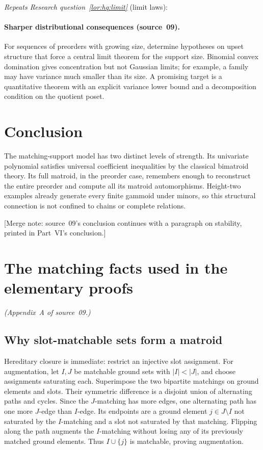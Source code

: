 \documentclass[11pt]{article}
\numberwithin{equation}{section}
\theoremstyle{definition}
\begin{document}
\noindent\emph{Repeats Research question~\ref{lor:hq:limit}} (limit laws):
\paragraph{Sharper distributional consequences (source~09).}
For sequences of preorders with growing size, determine hypotheses on
upset structure that force a central limit theorem for the support size.
Binomial convex domination gives concentration but not Gaussian limits;
for example, a family may have variance much smaller than its size.
A promising target is a quantitative theorem with an explicit variance
lower bound and a decomposition condition on the quotient poset.


\section{Conclusion}
\label{mat:sec:conclusion}
The matching-support model has two distinct levels of strength. Its
univariate polynomial satisfies universal coefficient inequalities by the
classical bimatroid theory. Its full matroid, in the preorder case,
remembers enough to reconstruct the entire preorder and compute all its
matroid automorphisms. Height-two examples already generate every finite
gammoid under minors, so this structural connection is not confined to
chains or complete relations.

[Merge note: source~09's conclusion continues with a paragraph on
stability, printed in Part~VI's conclusion.]

\section{The matching facts used in the elementary proofs}
\noindent\emph{(Appendix~A of source~09.)}
\label{mat:app:matching}
\subsection{Why slot-matchable sets form a matroid}
Hereditary closure is immediate: restrict an injective slot assignment.
For augmentation, let $I,J$ be matchable ground sets with $|I|<|J|$, and
choose assignments saturating each. Superimpose the two bipartite matchings
on ground elements and slots. Their symmetric difference is a disjoint
union of alternating paths and cycles. Since the $J$-matching has more
edges, one alternating path has one more $J$-edge than $I$-edge. Its
endpoints are a ground element $j\in J\setminus I$ not saturated by the
$I$-matching and a slot not saturated by that matching. Flipping along the
path augments the $I$-matching without losing any of its previously matched
ground elements. Thus $I\cup\{j\}$ is matchable, proving augmentation.
\end{document}
